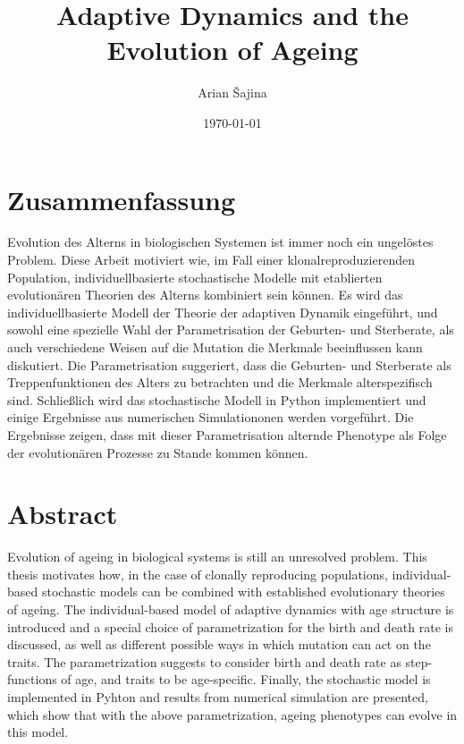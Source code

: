 \documentclass[11pt, a4paper]{article}
\author{Arian \v{S}ajina}
\date{\today}
\title{Adaptive Dynamics and the Evolution of Ageing}
\theoremstyle{definition}
\begin{document}
\maketitle

\clearpage

\tableofcontents
\newpage

\section*{Zusammenfassung}
    Evolution des Alterns in biologischen Systemen ist immer noch ein ungel\"ostes Problem. Diese Arbeit motiviert wie, im Fall einer klonalreproduzierenden Population, individuellbasierte stochastische Modelle mit etablierten evolution\"aren Theorien des Alterns kombiniert sein k\"onnen.
    Es wird das individuellbasierte Modell der Theorie der adaptiven Dynamik eingef\"uhrt, und sowohl eine spezielle Wahl der Parametrisation der Geburten- und Sterberate, als auch verschiedene Weisen auf die Mutation die Merkmale beeinflussen kann diskutiert.
    Die Parametrisation suggeriert, dass die Geburten- und Sterberate als Treppenfunktionen des Alters zu betrachten und die Merkmale alterspezifisch sind.
    Schlie\ss{}lich wird das stochastische Modell in Python implementiert und einige Ergebnisse aus numerischen Simulationonen werden vorgef\"uhrt. Die Ergebnisse zeigen, dass mit dieser Parametrisation alternde Phenotype als Folge der evolution\"aren Prozesse zu Stande kommen k\"onnen.

\section*{Abstract}
    Evolution of ageing in biological systems is still an unresolved problem. This thesis motivates how, in the case of clonally reproducing populations, individual-based stochastic models can be combined with established evolutionary theories of ageing. 
    The individual-based model of adaptive dynamics with age structure is introduced and a special choice of parametrization for the birth and death rate is discussed, as well as different possible ways in which mutation can act on the traits. 
    The parametrization suggests to consider birth and death rate as step-functions of age, and traits to be age-specific.
    Finally, the stochastic model is implemented in Pyhton and results from numerical simulation are presented, which show that with the above parametrization, ageing phenotypes can evolve in this model.
\end{document}
